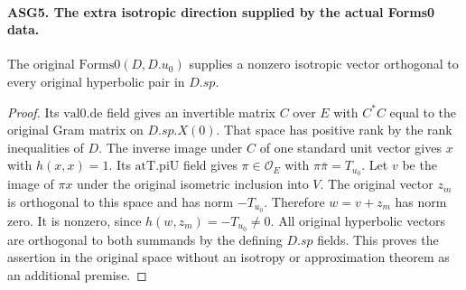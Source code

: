 \paragraph{ASG5. The extra isotropic direction supplied by the actual Forms0 data.}
\label{claim:ASG5}
The original \(\mathrm{Forms0}(D,D.u_0)\) supplies a nonzero
isotropic vector orthogonal to every original hyperbolic pair in \(D.sp\).
\begin{proof}
Its \(\mathrm{val0.de}\) field gives an invertible matrix
\(C\) over \(E\) with \(C^*C\) equal to the original Gram
matrix on \(D.sp.X(0)\).  That space has positive rank by the
rank inequalities of \(D\).  The inverse image under \(C\)
of one standard unit vector gives \(x\) with \(h(x,x)=1\).
Its \(\mathrm{atT.piU}\) field gives \(\pi\in\mathcal O_E\)
with \(\pi\bar\pi=T_{u_0}\).  Let \(v\) be the image of
\(\pi x\) under the original isometric inclusion into \(V\).
The original vector \(z_m\) is orthogonal to this space and has
norm \(-T_{u_0}\).  Therefore
\(w=v+z_m\) has norm zero.  It is nonzero, since
\(h(w,z_m)=-T_{u_0}\ne0\).  All original hyperbolic vectors
are orthogonal to both summands by the defining \(D.sp\) fields.
This proves the assertion in the original space without an isotropy
or approximation theorem as an additional premise.
\end{proof}

